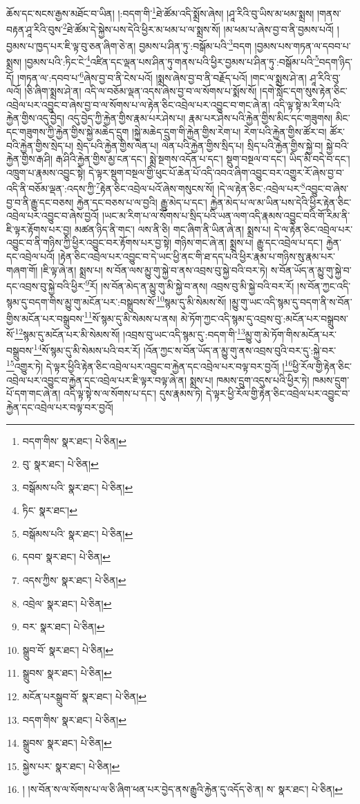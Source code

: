 ཆོས་དང་སངས་རྒྱས་མཐོང་བ་ཡིན། །:བདག་གི་\footnote{བདག་གིས་  སྣར་ཐང་།  པེ་ཅིན། }ཐེ་ཚོམ་འདི་སྨྲོས་ཞེས། །ཤཱ་རིའི་བུ་ཡིས་མ་ཕམ་སྨྲས། །གནས་བརྟན་ཤཱ་རིའི་བུས་\footnote{བུ་  སྣར་ཐང་།  པེ་ཅིན། }ཐེ་ཚོམ་དེ་སྐྱེས་པས་དེའི་ཕྱིར་མ་ཕམ་པ་ལ་སྨྲས་སོ། །མ་ཕམ་པ་ཞེས་བྱ་བ་ནི་བྱམས་པའོ། །བྱམས་པ་ཁྱད་པར་ཇི་ལྟ་བུ་ཅན་ཞིག་ཅེ་ན། བྱམས་པ་ཤིན་ཏུ་:བསྒོམ་པའི་\footnote{བསྒོམས་པའི་  སྣར་ཐང་།  པེ་ཅིན། }བདག །བྱམས་པས་གཏན་ལ་དབབ་པ་སྨྲས། །བྱམས་པའི་:ཏིང་ངེ་\footnote{ཏིང་  སྣར་ཐང་། }འཛིན་དང་ལྡན་པས་ཤིན་ཏུ་གནས་པའི་ཕྱིར་བྱམས་པ་ཤིན་ཏུ་:བསྒོམ་པའི་\footnote{བསྒོམས་པའི་  སྣར་ཐང་།  པེ་ཅིན། }བདག་ཉིད་དོ། །གཏན་ལ་:དབབ་པ་\footnote{དབབ་  སྣར་ཐང་།  པེ་ཅིན། }ཞེས་བྱ་བ་ནི་ངེས་པའོ། །སྨྲས་ཞེས་བྱ་བ་ནི་བརྗོད་པའོ། །གང་ལ་སྨྲས་ཤེ་ན། ཤཱ་རིའི་བུ་ལའོ། །ཅི་ཞིག་སྨྲས་ཤེ་ན། འདི་ལ་བཅོམ་ལྡན་འདས་ཞེས་བྱ་བ་ལ་སོགས་པ་སྨོས་སོ། །དགེ་སློང་དག་སུས་རྟེན་ཅིང་འབྲེལ་པར་འབྱུང་བ་ཞེས་བྱ་བ་ལ་སོགས་པ་ལ་རྟེན་ཅིང་འབྲེལ་པར་འབྱུང་བ་གང་ཞེ་ན། འདི་ལྟ་སྟེ་མ་རིག་པའི་རྐྱེན་གྱིས་འདུ་བྱེད། འདུ་བྱེད་ཀྱི་རྐྱེན་གྱིས་རྣམ་པར་ཤེས་པ། རྣམ་པར་ཤེས་པའི་རྐྱེན་གྱིས་མིང་དང་གཟུགས། མིང་དང་གཟུགས་ཀྱི་རྐྱེན་གྱིས་སྐྱེ་མཆེད་དྲུག །སྐྱེ་མཆེད་དྲུག་གི་རྐྱེན་གྱིས་རེག་པ། རེག་པའི་རྐྱེན་གྱིས་ཚོར་བ། ཚོར་བའི་རྐྱེན་གྱིས་སྲེད་པ། སྲེད་པའི་རྐྱེན་གྱིས་ལེན་པ། ལེན་པའི་རྐྱེན་གྱིས་སྲིད་པ། སྲིད་པའི་རྐྱེན་གྱིས་སྐྱེ་བ། སྐྱེ་བའི་རྐྱེན་གྱིས་རྒ་ཤི། རྒ་ཤིའི་རྐྱེན་གྱིས་མྱ་ངན་དང་། སྨྲེ་སྔགས་འདོན་པ་དང་། སྡུག་བསྔལ་བ་དང་། ཡིད་མི་བདེ་བ་དང་། འཁྲུག་པ་རྣམས་འབྱུང་སྟེ། དེ་ལྟར་སྡུག་བསྔལ་གྱི་ཕུང་པོ་ཆེན་པོ་འདི་འབའ་ཞིག་འབྱུང་བར་འགྱུར་རོ་ཞེས་བྱ་བ་འདི་ནི་བཅོམ་ལྡན་:འདས་ཀྱི་\footnote{འདས་ཀྱིས་  སྣར་ཐང་།  པེ་ཅིན། }རྟེན་ཅིང་འབྲེལ་པའོ་ཞེས་གསུངས་སོ། །དེ་ལ་རྟེན་ཅིང་:འབྲེལ་པར་\footnote{འབྲེལ་  སྣར་ཐང་།  པེ་ཅིན། }འབྱུང་བ་ཞེས་བྱ་བ་ནི་རྒྱུ་དང་བཅས། རྐྱེན་དང་བཅས་པ་ལ་བྱའི། རྒྱུ་མེད་པ་དང་། རྐྱེན་མེད་པ་ལ་མ་ཡིན་པས་དེའི་ཕྱིར་རྟེན་ཅིང་འབྲེལ་པར་འབྱུང་བ་ཞེས་བྱའོ། །ཡང་མ་རིག་པ་ལ་སོགས་པ་སྲིད་པའི་ཡན་ལག་འདི་རྣམས་འབྱུང་བའི་གོ་རིམ་ནི་ཇི་ལྟར་རྟོགས་པར་བྱ། མཚན་ཉིད་ནི་གང་། ལས་ནི་ཅི། གང་ཞིག་ནི་ཡིན་ཞེ་ན། སྨྲས་པ། དེ་ལ་རྟེན་ཅིང་འབྲེལ་པར་འབྱུང་བ་ནི་གཉིས་ཀྱི་ཕྱིར་འབྱུང་བར་རྟོགས་པར་བྱ་སྟེ། གཉིས་གང་ཞེ་ན། སྨྲས་པ། རྒྱུ་དང་འབྲེལ་པ་དང་། རྐྱེན་དང་འབྲེལ་པའོ། །རྟེན་ཅིང་འབྲེལ་པར་འབྱུང་བ་དེ་ཡང་ཕྱི་ནང་གི་ཐ་དད་པའི་ཕྱིར་རྣམ་པ་གཉིས་སུ་རྣམ་པར་གཞག་གོ། །ཇི་ལྟ་ཞེ་ན། སྨྲས་པ། ས་བོན་ལས་མྱུ་གུ་སྐྱེ་བ་ནས་འབྲས་བུ་སྐྱེ་བའི་བར་ཏེ། ས་བོན་ཡོད་ན་མྱུ་གུ་སྐྱེ་བ་དང་འབྲས་བུ་སྐྱེ་བའི་ཕྱིར་\footnote{བར་  སྣར་ཐང་།  པེ་ཅིན། }རོ། །ས་བོན་མེད་ན་མྱུ་གུ་མི་སྐྱེ་བ་ནས། འབྲས་བུ་མི་སྐྱེ་བའི་བར་རོ། །ས་བོན་ཀྱང་འདི་སྙམ་དུ་བདག་གིས་མྱུ་གུ་མངོན་པར་:བསྒྲུབས་སོ་\footnote{སྒྲུབ་བོ་  སྣར་ཐང་།  པེ་ཅིན། }སྙམ་དུ་མི་སེམས་སོ། །མྱུ་གུ་ཡང་འདི་སྙམ་དུ་བདག་ནི་ས་བོན་གྱིས་མངོན་པར་བསྒྲུབས་\footnote{སྒྲུབས་  སྣར་ཐང་།  པེ་ཅིན། }སོ་སྙམ་དུ་མི་སེམས་པ་ནས། མེ་ཏོག་ཀྱང་འདི་སྙམ་དུ་འབྲས་བུ་:མངོན་པར་བསྒྲུབས་སོ་\footnote{མངོན་པརསྒྲུབ་བོ་  སྣར་ཐང་།  པེ་ཅིན། }སྙམ་དུ་མངོན་པར་མི་སེམས་སོ། །འབྲས་བུ་ཡང་འདི་སྙམ་དུ་:བདག་གི་\footnote{བདག་གིས་  སྣར་ཐང་།  པེ་ཅིན། }མྱུ་གུ་མེ་ཏོག་གིས་མངོན་པར་བསྒྲུབས་\footnote{སྒྲུབས་  སྣར་ཐང་།  པེ་ཅིན། }སོ་སྙམ་དུ་མི་སེམས་པའི་བར་རོ། །འོན་ཀྱང་ས་བོན་ཡོད་ན་མྱུ་གུ་ནས་འབྲས་བུའི་བར་དུ་:སྐྱེ་བར་\footnote{སྐྱེས་པར་  སྣར་ཐང་།  པེ་ཅིན། }འགྱུར་ཏེ། དེ་ལྟར་ཕྱིའི་རྟེན་ཅིང་འབྲེལ་པར་འབྱུང་བ་རྐྱེན་དང་འབྲེལ་པར་བལྟ་བར་བྱའོ། །\footnote{། །ས་བོན་ས་ལ་སོགས་པ་ལ་ཅི་ཞིག་ཕན་པར་བྱེད་ནས་རྒྱུའི་རྐྱེན་དུ་འདོད་ཅེ་ན། ས་  སྣར་ཐང་།  པེ་ཅིན། }ཕྱི་རོལ་གྱི་རྟེན་ཅིང་འབྲེལ་པར་འབྱུང་བ་རྐྱེན་དང་འབྲེལ་པར་ཇི་ལྟར་བལྟ་ཞེ་ན། སྨྲས་པ། ཁམས་དྲུག་འདུས་པའི་ཕྱིར་ཏེ། ཁམས་དྲུག་པོ་དག་གང་ཞེ་ན། འདི་ལྟ་སྟེ་ས་ལ་སོགས་པ་དང་། དུས་རྣམས་ཏེ། དེ་ལྟར་ཕྱི་རོལ་གྱི་རྟེན་ཅིང་འབྲེལ་པར་འབྱུང་བ་རྐྱེན་དང་འབྲེལ་པར་བལྟ་བར་བྱའོ། 